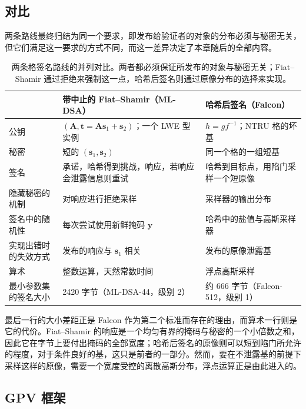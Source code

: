\subsection{对比}

两条路线最终归结为同一个要求，即发布给验证者的对象的分布必须与秘密无关，但它们满足这一要求的方式不同，而这一差异决定了本章随后的全部内容。

\begin{table}[H]
\centering
\small
\begin{tabular}{p{}p{}p{}}
\toprule
 & 带中止的 Fiat--Shamir（ML-DSA） & 哈希后签名（Falcon） \\
\midrule
公钥 & $(\mathbf{A}, \mathbf{t} = \mathbf{A}\mathbf{s}_1 + \mathbf{s}_2)$；一个 LWE 型实例 & $h = g f^{-1}$；NTRU 格的坏基 \\
秘密 & 短的 $(\mathbf{s}_1, \mathbf{s}_2)$ & 同一个格的一组短基 \\
签名 & 承诺，哈希得到挑战，响应，若响应会泄露信息则重试 & 哈希到目标点，用陷门采样一个短原像 \\
隐藏秘密的机制 & 对响应进行拒绝采样 & 采样器的输出分布 \\
签名中的随机性 & 每次尝试使用新鲜掩码 $\mathbf{y}$ & 哈希中的盐值与高斯采样器 \\
实现出错时的失效方式 & 发布的响应与 $\mathbf{s}_1$ 相关 & 发布的原像泄露基 \\
算术 & 整数运算，天然常数时间 & 浮点高斯采样 \\
最小参数集的签名大小 & 2420 字节（ML-DSA-44，级别 2） & 约 666 字节（Falcon-512，级别 1） \\
\bottomrule
\end{tabular}
\caption{两条格签名路线的并列对比。两者都必须保证所发布的对象与秘密无关；Fiat--Shamir 通过拒绝来强制这一点，哈希后签名则通过原像分布的选择来实现。}
\label{tab:hash-and-sign-vs-fs}
\end{table}

最后一行的大小差距正是 Falcon 作为第二个标准而存在的理由，而算术一行则是它的代价。Fiat--Shamir 的响应是一个均匀有界的掩码与秘密的一个小倍数之和，因此它在字节上要付出掩码的全部宽度；哈希后签名的原像则可以短到陷门所允许的程度，对于条件良好的基，这只是前者的一部分。然而，要在不泄露基的前提下采样这样的原像，需要一个宽度受控的离散高斯分布，浮点运算正是由此进入的。

\subsection{GPV 框架}
\label{sec:gpv}

